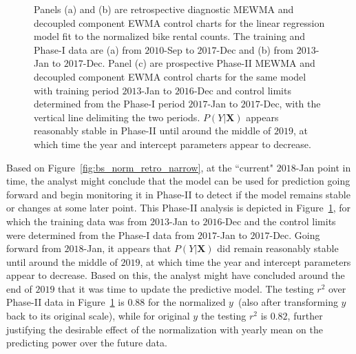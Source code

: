 \documentclass[twoside,11pt]{article}
\begin{document}
\begin{figure}[H]
\begin{subfigure}[t]{0.374\linewidth}
     \captionsetup{width=.95\linewidth}
     \caption{}
     \label{fig:bs_norm_prospective}
\end{subfigure}
\caption{Panels (a) and (b) are retrospective diagnostic MEWMA and decoupled component EWMA control charts for the linear regression model fit to the normalized bike rental counts. The training and Phase-I data are (a) from $2010$-Sep to $2017$-Dec and (b) from $2013$-Jan to $2017$-Dec. Panel (c) are prospective Phase-II MEWMA and decoupled component EWMA control charts for the same model with training period $2013$-Jan to $2016$-Dec and control limits determined from the Phase-I period $2017$-Jan to $2017$-Dec, with the vertical line delimiting the two periods. $P(Y|\bm{X})$ appears reasonably stable in Phase-II until around the middle of $2019$, at which time the year and intercept parameters appear to decrease.}
\label{fig:bike_sharing_norm}
\end{figure}

Based on Figure~\ref{fig:bs_norm_retro_narrow}, at the ``current" $2018$-Jan point in time, the analyst might conclude that the model can be used for prediction going forward and begin monitoring it in Phase-II to detect if the model remains stable or changes at some later point. This Phase-II analysis is depicted in Figure~\ref{fig:bs_norm_prospective}, for which the training data was from $2013$-Jan to $2016$-Dec and the control limits were determined from the Phase-I data from $2017$-Jan to $2017$-Dec. Going forward from $2018$-Jan, it appears that $P(Y|\bm{X})$ did remain reasonably stable until around the middle of $2019$, at which time the year and intercept parameters appear to decrease. Based on this, the analyst might have concluded around the end of $2019$ that it was time to update the predictive model. The testing $r^2$ over Phase-II data in Figure~\ref{fig:bs_norm_prospective} is $0.88$ for the normalized $y$~(also after transforming $y$ back to its original scale), while for original $y$ the testing $r^2$ is $0.82$, further justifying the desirable effect of the normalization with yearly mean on the predicting power over the future data.
\end{document}
